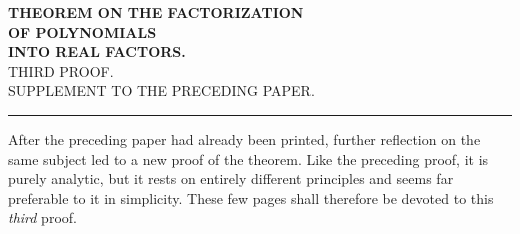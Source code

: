 \begin{center}
\textbf{THEOREM ON THE FACTORIZATION}\\[8pt]
\textbf{OF POLYNOMIALS}\\[8pt]
\textbf{INTO REAL FACTORS.}\\[8pt]
THIRD PROOF.\\[8pt]
SUPPLEMENT TO THE PRECEDING PAPER.\\[12pt]
\rule{3cm}{0.3pt}
\end{center}
After the preceding paper had already been printed, further reflection on the same subject led to a new proof of the theorem. Like the preceding proof, it is purely analytic, but it rests on entirely different principles and seems far preferable to it in simplicity. These few pages shall therefore be devoted to this \textit{third} proof.


